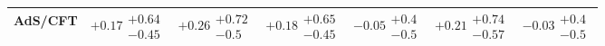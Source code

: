 \begin{tabular}{lllllll}
AdS/CFT                                   &       $+0.17\substack{+0.64 \\ -0.45}$ &        $+0.26\substack{+0.72 \\ -0.5}$ &       $+0.18\substack{+0.65 \\ -0.45}$ &         $-0.05\substack{+0.4 \\ -0.5}$ &       $+0.21\substack{+0.74 \\ -0.57}$ &         $-0.03\substack{+0.4 \\ -0.5}$ \\
\bottomrule
\end{tabular}
